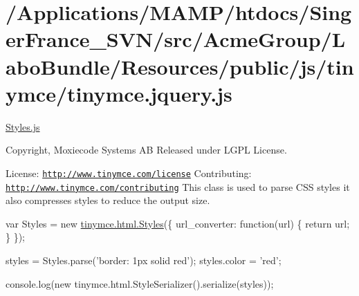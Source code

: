 \hypertarget{_2_applications_2_m_a_m_p_2htdocs_2_singer_france__s_v_n_2src_2_acme_group_2_labo_bundle_2_resou83c5f7ce5ca2131dd50036f993f63c31}{\section{/\+Applications/\+M\+A\+M\+P/htdocs/\+Singer\+France\+\_\+\+S\+V\+N/src/\+Acme\+Group/\+Labo\+Bundle/\+Resources/public/js/tinymce/tinymce.\+jquery.\+js}
}
\hyperlink{_styles_8js}{Styles.\+js}

Copyright, Moxiecode Systems A\+B Released under L\+G\+P\+L License.

License\+: \href{http://www.tinymce.com/license}{\tt http\+://www.\+tinymce.\+com/license} Contributing\+: \href{http://www.tinymce.com/contributing}{\tt http\+://www.\+tinymce.\+com/contributing} This class is used to parse C\+S\+S styles it also compresses styles to reduce the output size.

var Styles = new \hyperlink{classtinymce_1_1html_1_1_styles}{tinymce.\+html.\+Styles}(\{ url\+\_\+converter\+: function(url) \{ return url; \} \});

styles = Styles.\+parse('border\+: 1px solid red'); styles.\+color = 'red';

console.\+log(new tinymce.\+html.\+Style\+Serializer().serialize(styles));


\begin{DoxyCodeInclude}
\end{DoxyCodeInclude}
 